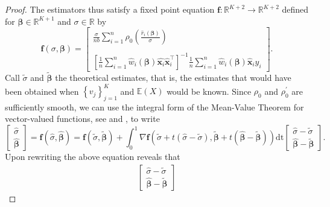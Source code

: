 \documentclass[11pt]{article}
\begin{document}
\begin{proof}
The estimators thus satisfy a fixed point equation $\mathbf{f}:\mathbb{R}^{K+2} \to \mathbb{R}^{K+2}$ defined for $\boldsymbol{\beta} \in \mathbb{R}^{K+1} $ and $\sigma\in \mathbb{R}$ by
\begin{equation*}
\mathbf{f}\left(\sigma , \boldsymbol{\beta}\right) = \begin{bmatrix}
\frac{\sigma}{nb} \sum_{i=1}^n   \rho_0 \left( \frac{\widehat{r}_i\left(\boldsymbol{\beta}\right)}{\sigma} \right) \\ \\
\left[ \frac{1}{n} \sum_{i=1}^n  \widehat{w}_i \left( \boldsymbol{\beta} \right)   \widehat{\mathbf{x}_i} \widehat{\mathbf{x}}_i^{\top} \right]^{-1} \frac{1}{n} \sum_{i=1}^n  \widehat{w}_i \left( \boldsymbol{\beta} \right) \mathbf{\widehat{x}}_i y_i
\end{bmatrix}.
\end{equation*}
Call $\widetilde{\sigma}$ and $\widetilde{\boldsymbol{\beta}}$ the theoretical estimates, that is, the estimates that would have been obtained when $\left\{v_j \right\}_{j=1}^K$ and $\mathbb{E}(X)$ would be known.
Since $\rho_0$ and $\rho_0^{\prime}$ are sufficiently smooth, we can use the integral form of the Mean-Value Theorem for vector-valued functions, see \cite[~Chapter 4]{ferguson2017course} and \cite{feng2014exact}, to write
\begin{equation}
\begin{bmatrix}
\widehat{\sigma} \\
\widehat{\boldsymbol{\beta}} 
\end{bmatrix} = \mathbf{f} \left(\widehat{\sigma}, \boldsymbol{\widehat{\beta}} \right) =  \mathbf{f} \left(\widetilde{\sigma}, \widetilde{\boldsymbol{\beta}} \right) + \int_{0}^1   \nabla{\mathbf{f}} \left( \widetilde{\sigma} + t \left(\widehat{\sigma} - \widetilde{\sigma} \right),  \boldsymbol{\widetilde{\beta}} + t \left( \boldsymbol{\widehat{\beta}}-\boldsymbol{\widetilde{\beta}} \right) \right) \mathrm{dt} \begin{bmatrix}
\widehat{\sigma} - \widetilde{\sigma} \\
\boldsymbol{\widehat{\beta}} - \boldsymbol{\widetilde{\beta}}
\end{bmatrix} .
\end{equation}
Upon rewriting the above equation reveals that
\begin{align}
\label{eq:43}
\begin{bmatrix}
\widehat{\sigma}-\widetilde{\sigma} \\
\boldsymbol{\widehat{\beta}}  - \boldsymbol{\widetilde{\beta}}

\end{bmatrix}
\end{align}
\end{proof}
\end{document}
